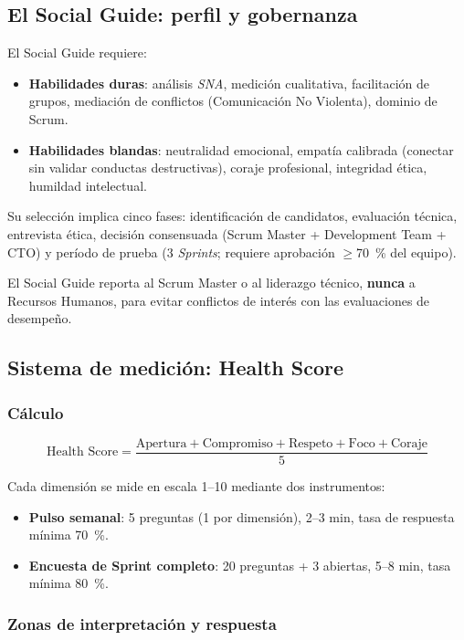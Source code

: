 \subsection{El Social Guide: perfil y gobernanza}

El Social Guide requiere:

\begin{itemize}
    \item \textbf{Habilidades duras}: análisis \textit{SNA}, medición cualitativa, facilitación de grupos, mediación de conflictos (Comunicación No Violenta), dominio de Scrum.
    \item \textbf{Habilidades blandas}: neutralidad emocional, empatía calibrada (conectar sin validar conductas destructivas), coraje profesional, integridad ética, humildad intelectual.
\end{itemize}

Su selección implica cinco fases: identificación de candidatos, evaluación técnica, entrevista ética, decisión consensuada (Scrum Master + Development Team + CTO) y período de prueba (3 \textit{Sprints}; requiere aprobación $\geq$70~\% del equipo).

El Social Guide reporta al Scrum Master o al liderazgo técnico, \textbf{nunca} a Recursos Humanos, para evitar conflictos de interés con las evaluaciones de desempeño.

\subsection{Sistema de medición: Health Score}

\subsubsection{Cálculo}

$$ \text{Health Score} = \frac{\text{Apertura} + \text{Compromiso} + \text{Respeto} + \text{Foco} + \text{Coraje}}{5} $$

Cada dimensión se mide en escala 1--10 mediante dos instrumentos:

\begin{itemize}
    \item \textbf{Pulso semanal}: 5 preguntas (1 por dimensión), 2--3 min, tasa de respuesta mínima 70~\%.
    \item \textbf{Encuesta de Sprint completo}: 20 preguntas + 3 abiertas, 5--8 min, tasa mínima 80~\%.
\end{itemize}

\subsubsection{Zonas de interpretación y respuesta}

